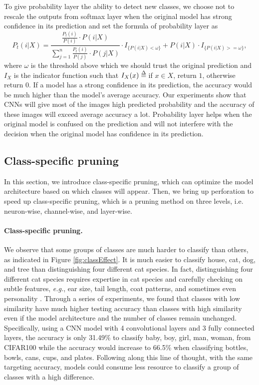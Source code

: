 \documentclass[pageno]{jpaper}
\def\delequal{\mathrel{\ensurestackMath{\stackon[1pt]{=}{\scriptstyle\Delta}}}}
\begin{document}
To give probability layer the ability to detect new classes, we choose not to rescale the outputs from softmax layer when the original model has strong confidence in its prediction and set the formula of probability layer as
\begin{equation} \label{eq: recover}
    P_t(i|X) = \frac{\frac{P_t(i)}{P(i)} \cdot P(i|X)}{\sum_{j=1}^n \frac{P_t(i)}{P(j)} \cdot P(j|X)} \cdot I_{\{P(i|X) < \omega\}} + P(i|X) \cdot I_{\{P(i|X) >= \omega\}}, 
\end{equation}
where $\omega$ is the threshold above which we should trust the original prediction and $I_X$ is the indicator function such that
$I_X(x) \delequal \; $if $x\in X$, return $1$, otherwise return $0$.
If a model has a strong confidence in its prediction, the accuracy would be much higher than the model's average accuracy. Our experiments show that CNNs will give most of the images high predicted probability and the accuracy of these images will exceed average accuracy a lot. Probability layer helps when the original model is confused on the prediction and will not interfere with the decision when the original model has confidence in its prediction.




\subsection{Class-specific pruning}
In this section, we introduce class-specific pruning, which can optimize the model architecture based on which classes will appear. Then, we bring up perforation to speed up class-specific pruning, which is a pruning method on three levels, i.e. neuron-wise, channel-wise, and layer-wise.


\paragraph{Class-specific pruning.} 
We observe that some groups of classes are much harder to classify than others, as indicated in Figure \ref{fig:classEffect}. It is much easier to classify house, cat, dog, and tree than distinguishing four different cat species. In fact, distinguishing four different cat species requires expertise in cat species and carefully checking on subtle features, \textit{e.g.}, ear size, tail length, coat patterns, and sometimes even personality \cite{cat2018}. Through a series of experiments, we found that classes with low similarity have much higher testing accuracy than classes with high similarity even if the model architecture and the number of classes remain unchanged. Specifically, using a CNN model with 4 convolutional layers and 3 fully connected layers, the accuracy is only 31.49\% to classify baby, boy, girl, man, woman, from CIFAR100 while the accuracy would increase to 66.5\% when classifying bottles, bowls, cans, cups, and plates. Following along this line of thought, with the same targeting accuracy, models could consume less resource to classify a group of classes with a high difference. 
\end{document}
